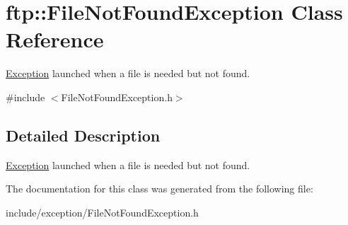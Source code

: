 \hypertarget{classftp_1_1_file_not_found_exception}{\section{ftp\-:\-:File\-Not\-Found\-Exception Class Reference}
\label{classftp_1_1_file_not_found_exception}
}


\hyperlink{classftp_1_1_exception}{Exception} launched when a file is needed but not found.  




{\ttfamily \#include $<$File\-Not\-Found\-Exception.\-h$>$}



\subsection{Detailed Description}
\hyperlink{classftp_1_1_exception}{Exception} launched when a file is needed but not found. 

The documentation for this class was generated from the following file\-:\begin{DoxyCompactItemize}
\item 
include/exception/File\-Not\-Found\-Exception.\-h\end{DoxyCompactItemize}
